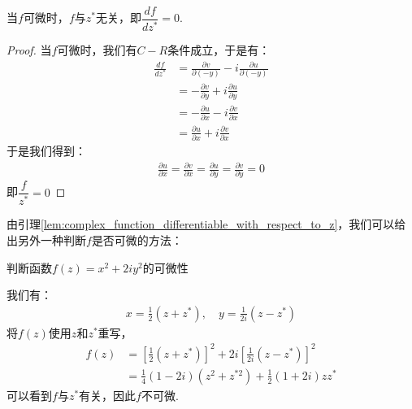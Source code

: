 \documentclass[lang=cn, titlestyle=display, scheme=chinese]{elegantbook}
\begin{document}
                \begin{lemma}
                    \label{lem:complex_function_differentiable_with_respect_to_z}
                    当$f$可微时，$f$与$z^*$无关，即$\dfrac{df}{dz^*} = 0$.
                \end{lemma}
                \begin{proof}
                    当$f$可微时，我们有$C-R$条件成立，于是有：
                    \allowdisplaybreaks
                    \begin{align*}
                        \frac{df}{dz^*} &= \frac{\partial v}{\partial (-y)} - i \frac{\partial u}{\partial (-y)}\\
                        &= -\frac{\partial v}{\partial y} + i \frac{\partial u}{\partial y}\\
                        &= -\frac{\partial u}{\partial x} - i \frac{\partial v}{\partial x}\\
                        &= \frac{\partial u}{\partial x} + i \frac{\partial v}{\partial x}
                    \end{align*}
                    于是我们得到：
                    \begin{align*}
                        \frac{\partial u}{\partial x} = \frac{\partial v}{\partial x} = \frac{\partial u}{\partial y} = \frac{\partial v}{\partial y} = 0
                    \end{align*}
                    即$\dfrac{f}{z^*} = 0$
                \end{proof}
                由引理\ref{lem:complex_function_differentiable_with_respect_to_z}，我们可以给出另外一种判断$f$是否可微的方法：
                \begin{example}
                    判断函数$f(z) = x^2 +2iy^2$的可微性
                \end{example}
                \begin{solution}
                    我们有：
                    \begin{align*}
                        x = \frac{1}{2}(z + z^*), \quad y = \frac{1}{2i}(z - z^*)
                    \end{align*}
                    将$f(z)$使用$z$和$z^*$重写，
                    \begin{align*}
                        f(z) &= [\frac{1}{2}(z + z^*)]^2 + 2i[\frac{1}{2i}(z - z^*)]^2\\
                        &= \frac{1}{4}(1 - 2i)(z^2 + z^{*2}) + \frac{1}{2}(1 + 2i)zz^*
                    \end{align*}
                    可以看到$f$与$z^*$有关，因此$f$不可微.
                \end{solution}
\end{document}
